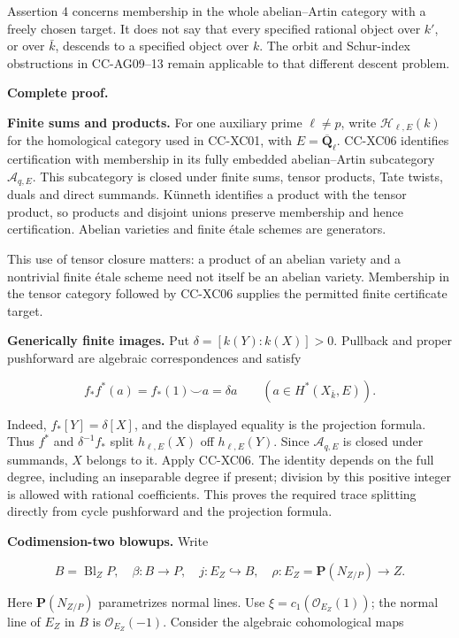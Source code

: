 Assertion 4 concerns membership in the whole abelian--Artin category
with a freely chosen target. It does not say that every specified
rational object over \(k'\), or over \(\bar k\), descends to a specified
object over \(k\). The orbit and Schur-index obstructions in CC-AG09--13
remain applicable to that different descent problem.

\textbf{Complete proof.}

\textbf{Finite sums and products.} For one auxiliary prime
\(\ell\ne p\), write \(\mathcal H_{\ell,E}(k)\) for the homological
category used in CC-XC01, with \(E=\overline{\mathbf Q}_\ell\). CC-XC06
identifies certification with membership in its fully embedded
abelian--Artin subcategory \(\mathcal A_{q,E}\). This subcategory is
closed under finite sums, tensor products, Tate twists, duals and direct
summands. Künneth identifies a product with the tensor product, so
products and disjoint unions preserve membership and hence
certification. Abelian varieties and finite étale schemes are
generators.

This use of tensor closure matters: a product of an abelian variety and
a nontrivial finite étale scheme need not itself be an abelian variety.
Membership in the tensor category followed by CC-XC06 supplies the
permitted finite certificate target.

\textbf{Generically finite images.} Put \(\delta=[k(Y):k(X)]>0\).
Pullback and proper pushforward are algebraic correspondences and
satisfy

\[
 f_*f^*(a)=f_*(1)\smile a=\delta a
 \qquad(a\in H^*(X_{\bar k},E)).
 \tag{CC-XC.11}
\]

Indeed, \(f_*[Y]=\delta[X]\), and the displayed equality is the
projection formula. Thus \(f^*\) and \(\delta^{-1}f_*\) split
\(h_{\ell,E}(X)\) off \(h_{\ell,E}(Y)\). Since \(\mathcal A_{q,E}\) is
closed under summands, \(X\) belongs to it. Apply CC-XC06. The identity
depends on the full degree, including an inseparable degree if present;
division by this positive integer is allowed with rational coefficients.
This proves the required trace splitting directly from cycle pushforward
and the projection formula.

\textbf{Codimension-two blowups.} Write

\[
 B=\operatorname{Bl}_ZP,\quad
 \beta:B\to P,\quad
 j:E_Z\hookrightarrow B,\quad
 \rho:E_Z=\mathbf P(N_{Z/P})\to Z.
\]

Here \(\mathbf P(N_{Z/P})\) parametrizes normal lines. Use
\(\xi=c_1(\mathcal O_{E_Z}(1))\); the normal line of \(E_Z\) in \(B\) is
\(\mathcal O_{E_Z}(-1)\). Consider the algebraic cohomological maps


